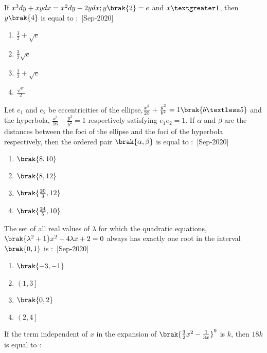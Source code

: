 \iffalse
    \title{2020}
    \author{EE24BTECH11021}
    \section{mcq-single}
\fi
    \item If $x^3dy+xy dx=x^2dy+2y dx;y\brak{2}=e$ and $x\textgreater 1$, then $y\brak{4}$ is equal to $\colon$
    \hfill{[Sep-2020]}
        \begin{enumerate}
            \item $\frac{3}{2}+\sqrt{e}$
            \item $\frac{3}{2}\sqrt{e}$
            \item $\frac{1}{2}+\sqrt{e}$
            \item $\frac{\sqrt{e}}{2}$
        \end{enumerate}
    \item Let $e_1$ and $e_2$ be eccentricities of the ellipse,$\frac{x^2}{25}+\frac{y^2}{b^2}=1\brak{b\textless 5}$ and the hyperbola, $\frac{x^2}{16}-\frac{y^2}{b^2}=1$ respectively satisfying $e_1e_2=1$. If $\alpha$ and $\beta$ are the distances between the foci of the ellipse and the foci of the hyperbola respectively, then the ordered pair $\brak{\alpha,\beta}$ is equal to $\colon$
    \hfill{[Sep-2020]}
        \begin{enumerate}
            \item $\brak{8,10}$
            \item $\brak{8,12}$
            \item $\brak{\frac{20}{3},12}$
            \item $\brak{\frac{24}{5},10}$
        \end{enumerate}
    \item The set of all real values of $\lambda$ for which the quadratic equations,\\ $\brak{\lambda^2+1}x^2-4\lambda x+2=0$ always has exactly one root in the interval $\brak{0,1}$ is $\colon$
    \hfill{[Sep-2020]}
        \begin{enumerate}
            \item $\brak{-3,-1}$
            \item $\left(1,3 \right]$
            \item $\brak{0,2}$
            \item $\left(2,4 \right]$
        \end{enumerate}
    \item If the term independent of $x$ in the expansion of $\brak{\frac{3}{2}x^2-\frac{1}{3x}}^9$ is $k$, then $18k$ is equal to $\colon$
